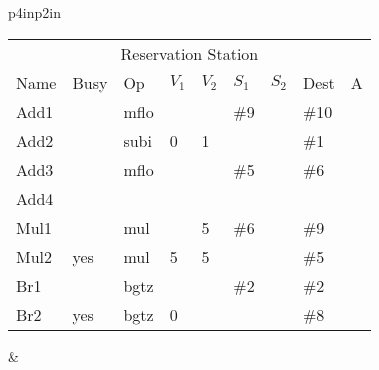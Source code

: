 \begin{tabular}{p{4in}p{2in}}
\noindent
\begin{tabular}{lllllllll}
\multicolumn{9}{c}{Reservation Station} \\
Name & Busy & Op   & $V_1$ & $V_2$ & $S_1$ & $S_2$ & Dest & A \\ \hline
Add1 &      & mflo &       &       & \#9   &       & \#10 &   \\
Add2 &      & subi & 0     & 1     &       &       & \#1  &   \\
Add3 &      & mflo &       &       & \#5   &       & \#6  &   \\
Add4 &      &      &       &       &       &       &      &   \\ \hline
Mul1 &      & mul  &       & 5     & \#6   &       & \#9  &   \\
Mul2 & yes  & mul  & 5     & 5     &       &       & \#5  &   \\ \hline
Br1  &      & bgtz &       &       & \#2   &       & \#2  &   \\
Br2  & yes  & bgtz & 0     &       &       &       & \#8  &   \\
\end{tabular} &  \\
\end{tabular}






